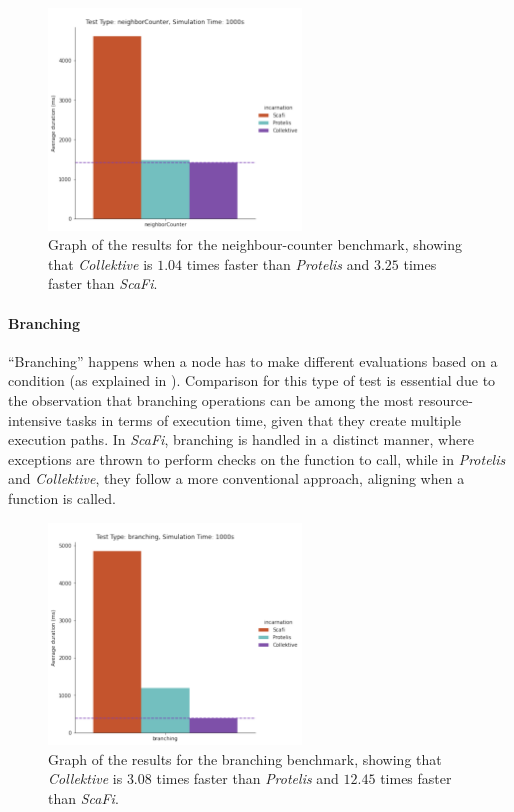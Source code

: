 \begin{figure}[ht!]
    \centering
    \includegraphics[width=0.6\textwidth]{figures/neighboring-results}
    \caption{Graph of the results for the neighbour-counter benchmark, showing that \emph{Collektive} is $1.04$ times faster
    than \emph{Protelis} and $3.25$ times faster than \emph{ScaFi}.}
    \label{fig:neghbour-counter}
\end{figure}

\paragraph{Branching}
``Branching'' happens when a node has to make different evaluations based on a condition (as explained in ).
Comparison for this type of test is essential due to the observation that branching operations can be among the most
resource-intensive tasks in terms of execution time, given that they create multiple execution paths.
In \emph{ScaFi}, branching is handled in a distinct manner, where exceptions are thrown to perform checks on the function to call,
while in \emph{Protelis} and \emph{Collektive}, they follow a more conventional approach, aligning when a function is called.

\begin{figure}[ht!]
    \centering
    \includegraphics[width=0.6\textwidth]{figures/branching-results}
    \caption{Graph of the results for the branching benchmark, showing that \emph{Collektive} is $3.08$ times faster
    than \emph{Protelis} and $12.45$ times faster than \emph{ScaFi}.}
    \label{fig:branching}
\end{figure}

